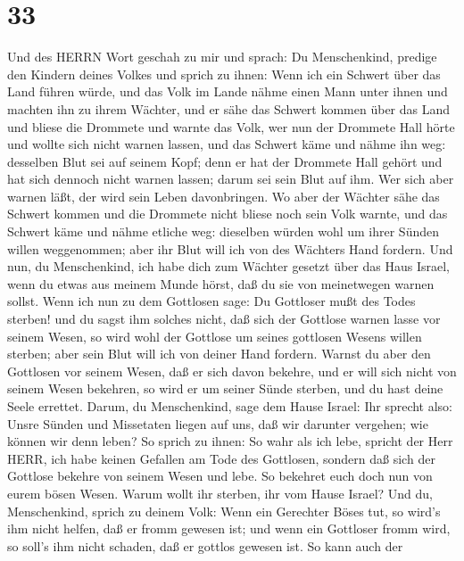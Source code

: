 \hypertarget{section-32}{%
\section{33}\label{section-32}}

 Und des HERRN Wort geschah zu mir und sprach: 
Du Menschenkind, predige den Kindern deines Volkes und sprich zu ihnen:
Wenn ich ein Schwert über das Land führen würde, und das Volk im Lande
nähme einen Mann unter ihnen und machten ihn zu ihrem Wächter,
 und er sähe das Schwert kommen über das Land und bliese die
Drommete und warnte das Volk,  wer nun der Drommete Hall
hörte und wollte sich nicht warnen lassen, und das Schwert käme und
nähme ihn weg: desselben Blut sei auf seinem Kopf;  denn er
hat der Drommete Hall gehört und hat sich dennoch nicht warnen lassen;
darum sei sein Blut auf ihm. Wer sich aber warnen läßt, der wird sein
Leben davonbringen.  Wo aber der Wächter sähe das Schwert
kommen und die Drommete nicht bliese noch sein Volk warnte, und das
Schwert käme und nähme etliche weg: dieselben würden wohl um ihrer
Sünden willen weggenommen; aber ihr Blut will ich von des Wächters Hand
fordern.  Und nun, du Menschenkind, ich habe dich zum
Wächter gesetzt über das Haus Israel, wenn du etwas aus meinem Munde
hörst, daß du sie von meinetwegen warnen sollst.  Wenn ich
nun zu dem Gottlosen sage: Du Gottloser mußt des Todes sterben! und du
sagst ihm solches nicht, daß sich der Gottlose warnen lasse vor seinem
Wesen, so wird wohl der Gottlose um seines gottlosen Wesens willen
sterben; aber sein Blut will ich von deiner Hand fordern. 
Warnst du aber den Gottlosen vor seinem Wesen, daß er sich davon
bekehre, und er will sich nicht von seinem Wesen bekehren, so wird er um
seiner Sünde sterben, und du hast deine Seele errettet. 
Darum, du Menschenkind, sage dem Hause Israel: Ihr sprecht also: Unsre
Sünden und Missetaten liegen auf uns, daß wir darunter vergehen; wie
können wir denn leben?  So sprich zu ihnen: So wahr als ich
lebe, spricht der Herr HERR, ich habe keinen Gefallen am Tode des
Gottlosen, sondern daß sich der Gottlose bekehre von seinem Wesen und
lebe. So bekehret euch doch nun von eurem bösen Wesen. Warum wollt ihr
sterben, ihr vom Hause Israel?  Und du, Menschenkind,
sprich zu deinem Volk: Wenn ein Gerechter Böses tut, so wird's ihm nicht
helfen, daß er fromm gewesen ist; und wenn ein Gottloser fromm wird, so
soll's ihm nicht schaden, daß er gottlos gewesen ist. So kann auch der
